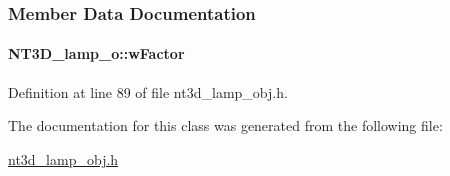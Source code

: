 \subsubsection{Member Data Documentation}
\paragraph[{wFactor}]{ {\bf NT3D\_\-lamp\_\-o::wFactor}}\hfill\label{class_n_t3_d__lamp__o_aba03f0ce7df17f32afa31ff3e760c91b}


Definition at line 89 of file nt3d\_\-lamp\_\-obj.h.



The documentation for this class was generated from the following file:\begin{DoxyCompactItemize}
\item 
\hyperlink{nt3d__lamp__obj_8h}{nt3d\_\-lamp\_\-obj.h}\end{DoxyCompactItemize}
